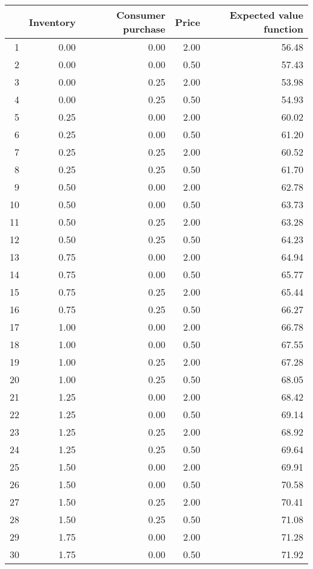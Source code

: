 \begin{tabular}{rrrrr}
  \hline
 & Inventory & Consumer purchase & Price & Expected value function \\ 
  \hline
1 & 0.00 & 0.00 & 2.00 & 56.48 \\ 
  2 & 0.00 & 0.00 & 0.50 & 57.43 \\ 
  3 & 0.00 & 0.25 & 2.00 & 53.98 \\ 
  4 & 0.00 & 0.25 & 0.50 & 54.93 \\ 
  5 & 0.25 & 0.00 & 2.00 & 60.02 \\ 
  6 & 0.25 & 0.00 & 0.50 & 61.20 \\ 
  7 & 0.25 & 0.25 & 2.00 & 60.52 \\ 
  8 & 0.25 & 0.25 & 0.50 & 61.70 \\ 
  9 & 0.50 & 0.00 & 2.00 & 62.78 \\ 
  10 & 0.50 & 0.00 & 0.50 & 63.73 \\ 
  11 & 0.50 & 0.25 & 2.00 & 63.28 \\ 
  12 & 0.50 & 0.25 & 0.50 & 64.23 \\ 
  13 & 0.75 & 0.00 & 2.00 & 64.94 \\ 
  14 & 0.75 & 0.00 & 0.50 & 65.77 \\ 
  15 & 0.75 & 0.25 & 2.00 & 65.44 \\ 
  16 & 0.75 & 0.25 & 0.50 & 66.27 \\ 
  17 & 1.00 & 0.00 & 2.00 & 66.78 \\ 
  18 & 1.00 & 0.00 & 0.50 & 67.55 \\ 
  19 & 1.00 & 0.25 & 2.00 & 67.28 \\ 
  20 & 1.00 & 0.25 & 0.50 & 68.05 \\ 
  21 & 1.25 & 0.00 & 2.00 & 68.42 \\ 
  22 & 1.25 & 0.00 & 0.50 & 69.14 \\ 
  23 & 1.25 & 0.25 & 2.00 & 68.92 \\ 
  24 & 1.25 & 0.25 & 0.50 & 69.64 \\ 
  25 & 1.50 & 0.00 & 2.00 & 69.91 \\ 
  26 & 1.50 & 0.00 & 0.50 & 70.58 \\ 
  27 & 1.50 & 0.25 & 2.00 & 70.41 \\ 
  28 & 1.50 & 0.25 & 0.50 & 71.08 \\ 
  29 & 1.75 & 0.00 & 2.00 & 71.28 \\ 
  30 & 1.75 & 0.00 & 0.50 & 71.92 \\ 

\end{tabular}
